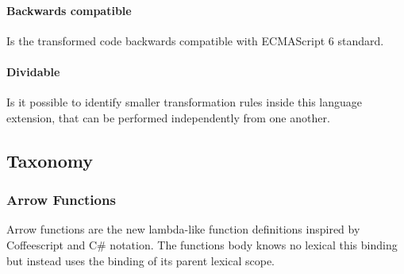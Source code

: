 \documentclass[10pt,a4paper]{article}
\begin{document}
\paragraph{Backwards compatible}
Is the transformed code backwards compatible with ECMAScript 6 standard.

\paragraph{Dividable}
Is it possible to identify smaller transformation rules inside this language extension, that can be performed independently from one another.

\subsection{Taxonomy}

\subsubsection{Arrow Functions}
Arrow functions\cite[14.2]{SpecJS} are the new lambda-like function definitions inspired by Coffeescript and C\# notation. The functions body knows no lexical this binding but instead uses the binding of its parent lexical scope.
\end{document}
